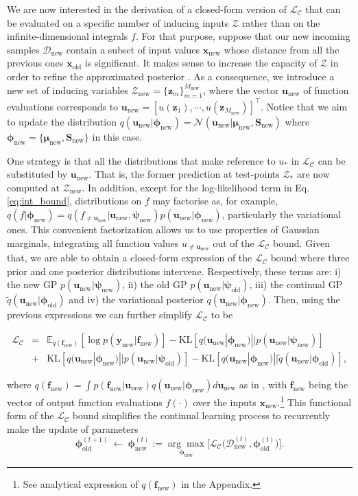 \documentclass[]{article}
\def\S{{\mathbf S}}
\def\u{{\mathbf u}}
\def\f{{\mathbf f}}
\newcommand{\psiold}{{\bm{\psi}_{\text{old}}}}
\newcommand{\psinew}{{\bm{\psi}_{\text{new}}}}
\newcommand{\unew}{{\u_{\text{new}}}}
\newcommand{\fnew}{{\f_{\text{new}}}}
\newcommand{\Zcal}{\mathcal{Z}}
\newcommand{\Dcal}{\mathcal{D}}
\newcommand{\Lcal}{\mathcal{L}}
\newcommand{\xc}{\bm{x}}
\newcommand{\yc}{\bm{y}}
\newcommand{\zc}{\bm{z}}
\newcommand{\xcnew}{{\xc_{\text{new}}}}
\newcommand{\ycnew}{{\yc_{\text{new}}}}
\newcommand{\xcold}{{\xc_{\text{old}}}}
\newcommand{\phiold}{{\bm{\phi}_{\text{old}}}}
\newcommand{\phinew}{{\bm{\phi}_{\text{new}}}}
\begin{document}
We are now interested in the derivation of a closed-form version of $\Lcal_\mathcal{C}$ that can be evaluated on a specific number of inducing inputs $\Zcal$ rather than on the infinite-dimensional integrals $f$. For that purpose, suppose that our new incoming samples $\Dcal_{\text{new}}$ contain a subset of input values $\xcnew$ whose distance from all the previous ones $\xcold$ is significant. It makes sense to increase the capacity of $\Zcal$ in order to refine the approximated posterior \citep{burt2019rates}. As a consequence, we introduce a new set of inducing variables $\Zcal_\text{new} = \{\zc_m\}^{M_\text{new}}_{m=1}$, where the vector $\unew$ of function evaluations corresponds to $\unew = [u(\zc_1), \cdots, u(\zc_{M_\text{new}}) ]^\top$. Notice that we aim to update the distribution $q(\unew|\phinew) = \mathcal{N}(\unew|\bm{\mu}_\text{new}, \bm{\S}_\text{new})$ where $\phinew = \{\bm{\mu}_\text{new}, \bm{\S}_\text{new}\}$ in this case.

One strategy is that all the distributions that make reference to $u_*$ in $\mathcal{L}_\mathcal{C}$ can be substituted by $\unew$. That is, the former prediction at test-points $\Zcal_*$ are now computed at $\Zcal_\text{new}$. In addition, except for the log-likelihood term in Eq. \eqref{eq:int_bound}, distributions on $f$ may factorise as, for example, $q(f|\phinew) = q(f_{\neq \unew}|\unew, \psinew)p(\unew|\phinew)$, particularly the variational ones. This convenient factorization allows us to use properties of Gaussian marginals, integrating all function values $u_{\neq \unew}$ out of the $\Lcal_{\mathcal{C}}$ bound. Given that, we are able to obtain a closed-form expression of the $\Lcal_{\mathcal{C}}$ bound where three prior and one posterior distributions intervene. Respectively, these terms are: i) the new GP $p(\unew|\psinew)$, ii) the old GP $p(\unew|\psiold)$, iii) the continual GP $\widetilde{q}(\unew|\phiold)$ and iv) the variational posterior $q(\unew|\phinew)$. Then, using the previous expressions we can further simplify $\Lcal_{\mathcal{C}}$ to be

\begin{eqnarray}
\label{eq:continual_bound}
\Lcal_{\mathcal{C}} &=&\mathbb{E}_{q(\fnew)} [\log p(\ycnew|\fnew)] - \text{KL}[q(\unew|\phinew)||p(\unew|\psinew)] \nonumber\\
&+&\text{KL}[q(\unew|\phinew)||p(\unew|\psiold)] - \text{KL}[q(\unew|\phinew)||\widetilde{q}(\unew|\phiold)],
\end{eqnarray}

where $q(\fnew) = \int p(\fnew|\unew)q(\unew|\phinew)d\unew$ as in \citet{saul2016chained}, with $\fnew$ being the vector of output function evaluations $f(\cdot)$ over the inputs $\xcnew$.\footnote{See analytical expression of $q(\fnew)$ in the Appendix.} This functional form of the $\Lcal_{\mathcal{C}}$ bound simplifies the continual learning process to recurrently make the update of parameters
$$\bm{\phi}^{(t+1)}_\text{old}  ~\leftarrow~ \bm{\phi}^{(t)}_\text{new} := \underset{\phinew}{\arg\max}\Big[\Lcal_{\mathcal{C}}\Big(\Dcal^{(t)}_{\text{new}}, \bm{\phi}^{(t)}_\text{old} \Big)\Big].$$
\end{document}

